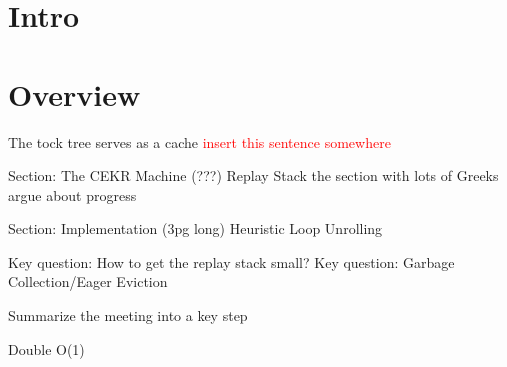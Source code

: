\documentclass[acmsmall]{acmart}
\newcommand\todo[1]{\textcolor{red}{#1}}
\begin{document}

\maketitle


\section{Intro}

\section{Overview}	
The tock tree serves as a cache \todo{insert this sentence somewhere}

Section: The CEKR Machine (???)
Replay Stack
the section with lots of Greeks
argue about progress

Section: Implementation (3pg long)
Heuristic
Loop Unrolling

Key question: How to get the replay stack small?
Key question: Garbage Collection/Eager Eviction

Summarize the meeting into a key step

Double O(1)





%
%
%
%
%
%
%

\appendix

\end{document}
